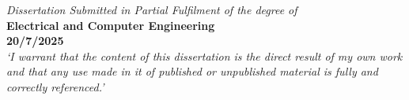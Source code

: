 \begin{center}


\normalsize \textsl{Dissertation Submitted in Partial Fulfilment of the degree of} \\
\large \textbf{Electrical and Computer Engineering}\\
\large \textbf{20/7/2025}\\[5.5cm]

\large \textsl{`I warrant that the content of this dissertation is the direct result of my own work and that any use made in it of published or unpublished material is fully and correctly referenced.'}\\
\end{center}
\newpage